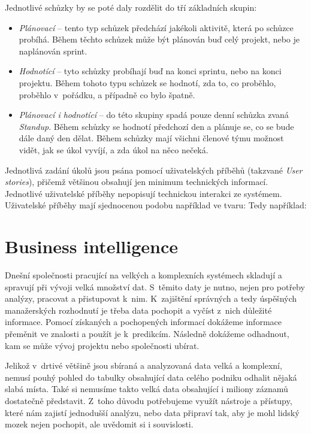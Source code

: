 \documentclass[czech,master]{diploma}
\begin{document}
Jednotlivé schůzky by se poté daly rozdělit do tří základních skupin:

\begin{itemize}
\item \textit{Plánovací} -- tento typ schůzek předchází jakékoli aktivitě, která po schůzce probíhá. Během těchto schůzek může být plánován buď celý projekt, nebo je naplánován sprint.
\item \textit{Hodnotící} -- tyto schůzky probíhají buď na konci sprintu, nebo na konci projektu. Během tohoto typu schůzek se hodnotí, zda to, co proběhlo, proběhlo v~pořádku, a případně co bylo špatně.
\item \textit{Plánovací i hodnotící} -- do této skupiny spadá pouze denní schůzka zvaná \textit{Standup}. Během schůzky se hodnotí předchozí den a plánuje se, co se bude dále daný den dělat. Během schůzky mají všichni členové týmu možnost vidět, jak se úkol vyvíjí, a zda úkol na něco nečeká.
\end{itemize}


Jednotlivá zadání úkolů jsou psána pomocí uživatelských příběhů (takzvané \textit{User stories}), přičemž většinou obsahují jen minimum technických informací. Jednotlivé uživatelské příběhy nepopisují technickou interakci ze systémem. Uživatelské příběhy mají  sjednocenou podobu například ve tvaru:  Tedy například:  \cite{ref:scrum_myslin_us}



\chapter{Business intelligence}
\label{sec:bi}
Dnešní společnosti pracující na velkých a komplexních systémech skladují a spravují při vývoji velká množství dat. S~těmito daty je nutno, nejen pro potřeby analýzy, pracovat a přistupovat k~nim. K~zajištění správných a tedy úspěšných manažerských rozhodnutí je třeba data pochopit a vyčíst z~nich důležité informace. Pomocí získaných a pochopených informací dokážeme informace přeměnit ve znalosti a použít je k~predikcím. Následně dokážeme odhadnout, kam se může vývoj projektu nebo společnosti ubírat.

Jelikož v~drtivé většině jsou sbíraná a analyzovaná data velká a komplexní, nemusí pouhý pohled do tabulky obsahující data celého podniku odhalit nějaká slabá místa. Také si nemusíme takto velká data obsahující i miliony záznamů dostatečně představit. Z~toho důvodu potřebujeme využít nástroje a přístupy, které nám zajistí jednodušší analýzu, nebo data připraví tak, aby je mohl lidský mozek nejen pochopit, ale uvědomit si i souvislosti.
\end{document}
